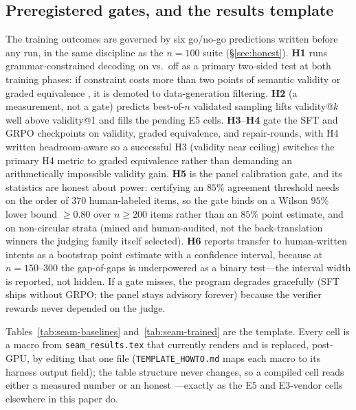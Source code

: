 \documentclass{article}
\begin{document}
\subsection{Preregistered gates, and the results template}\label{sec:seam-gates}
The training outcomes are governed by six go/no-go predictions written before any run, in the same discipline as the $n{=}100$ suite (\S\ref{sec:honest}). \textbf{H1} runs grammar-constrained decoding on vs.\ off as a primary two-sided test at both training phases: if constraint costs more than two points of semantic validity or graded equivalence \citep{formattax26}, it is demoted to data-generation filtering. \textbf{H2} (a measurement, not a gate) predicts best-of-$n$ validated sampling lifts validity@$k$ well above validity@1 and fills the pending E5 cells. \textbf{H3}--\textbf{H4} gate the SFT and GRPO checkpoints on validity, graded equivalence, and repair-rounds, with H4 written headroom-aware so a successful H3 (validity near ceiling) switches the primary H4 metric to graded equivalence rather than demanding an arithmetically impossible validity gain. \textbf{H5} is the panel calibration gate, and its statistics are honest about power: certifying an $85\%$ agreement threshold needs on the order of $370$ human-labeled items, so the gate binds on a Wilson $95\%$ lower bound $\geq 0.80$ over $n \geq 200$ items rather than an $85\%$ point estimate, and on non-circular strata (mined and human-audited, not the back-translation winners the judging family itself selected). \textbf{H6} reports transfer to human-written intents as a bootstrap point estimate with a confidence interval, because at $n{=}150$--$300$ the gap-of-gaps is underpowered as a binary test---the interval width is reported, not hidden. If a gate misses, the program degrades gracefully (SFT ships without GRPO; the panel stays advisory forever) because the verifier rewards never depended on the judge.

Tables~\ref{tab:seam-baselines} and~\ref{tab:seam-trained} are the template. Every cell is a macro from \texttt{seam\_results.tex} that currently renders \pending{} and is replaced, post-GPU, by editing that one file (\texttt{TEMPLATE\_HOWTO.md} maps each macro to its harness output field); the table structure never changes, so a compiled cell reads either a measured number or an honest \pending{}---exactly as the E5 and E3-vendor cells elsewhere in this paper do.
\end{document}

